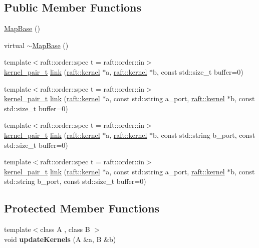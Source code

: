 \subsection*{Public Member Functions}
\begin{DoxyCompactItemize}
\item 
\hyperlink{class_map_base_a5a923d5b3ececb0407aa934d967ab7b1}{Map\+Base} ()
\item 
virtual \hyperlink{class_map_base_a6c62d788746d2161264b84ba66efcfbe}{$\sim$\+Map\+Base} ()
\item 
{\footnotesize template$<$raft\+::order\+::spec t = raft\+::order\+::in$>$ }\\\hyperlink{classkernel__pair__t}{kernel\+\_\+pair\+\_\+t} \hyperlink{class_map_base_ad98ef02c1651130ad6b565ad156b97c1}{link} (\hyperlink{classraft_1_1kernel}{raft\+::kernel} $\ast$a, \hyperlink{classraft_1_1kernel}{raft\+::kernel} $\ast$b, const std\+::size\+\_\+t buffer=0)
\item 
{\footnotesize template$<$raft\+::order\+::spec t = raft\+::order\+::in$>$ }\\\hyperlink{classkernel__pair__t}{kernel\+\_\+pair\+\_\+t} \hyperlink{class_map_base_ad982ebf61439a069ed36dc5f756b732a}{link} (\hyperlink{classraft_1_1kernel}{raft\+::kernel} $\ast$a, const std\+::string a\+\_\+port, \hyperlink{classraft_1_1kernel}{raft\+::kernel} $\ast$b, const std\+::size\+\_\+t buffer=0)
\item 
{\footnotesize template$<$raft\+::order\+::spec t = raft\+::order\+::in$>$ }\\\hyperlink{classkernel__pair__t}{kernel\+\_\+pair\+\_\+t} \hyperlink{class_map_base_a19a0a2f6842a863327920776457c52bf}{link} (\hyperlink{classraft_1_1kernel}{raft\+::kernel} $\ast$a, \hyperlink{classraft_1_1kernel}{raft\+::kernel} $\ast$b, const std\+::string b\+\_\+port, const std\+::size\+\_\+t buffer=0)
\item 
{\footnotesize template$<$raft\+::order\+::spec t = raft\+::order\+::in$>$ }\\\hyperlink{classkernel__pair__t}{kernel\+\_\+pair\+\_\+t} \hyperlink{class_map_base_af06481b99a96e3c5ae8da88cc8a78e91}{link} (\hyperlink{classraft_1_1kernel}{raft\+::kernel} $\ast$a, const std\+::string a\+\_\+port, \hyperlink{classraft_1_1kernel}{raft\+::kernel} $\ast$b, const std\+::string b\+\_\+port, const std\+::size\+\_\+t buffer=0)
\end{DoxyCompactItemize}
\subsection*{Protected Member Functions}
\begin{DoxyCompactItemize}
\item 
\hypertarget{class_map_base_aae7df0d3ff932ba938186e45c6469c02}{}\label{class_map_base_aae7df0d3ff932ba938186e45c6469c02} 
{\footnotesize template$<$class A , class B $>$ }\\void {\bfseries update\+Kernels} (A \&a, B \&b)
\end{DoxyCompactItemize}
